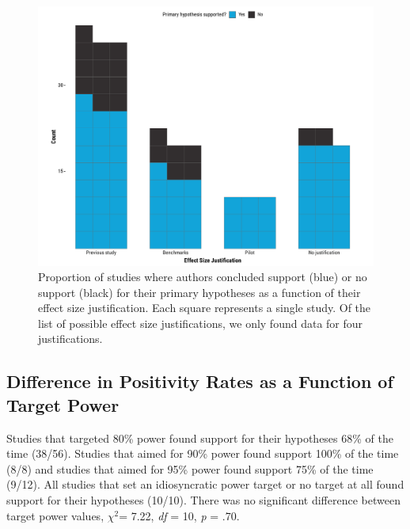 \documentclass[
  man, donotrepeattitle,mask,floatsintext]{apa7}
\begin{document}
\begin{figure}

{\centering \includegraphics{../../figs/fig3} 

}

\caption{Proportion of studies where authors concluded support (blue) or no support (black) for their primary hypotheses as a function of their effect size justification. Each square represents a single study. Of the list of possible effect size justifications, we only found data for four justifications.}\label{fig:fig3}
\end{figure}



\pagebreak

\hypertarget{difference-in-positivity-rates-as-a-function-of-target-power}{%
\subsection{Difference in Positivity Rates as a Function of Target Power}\label{difference-in-positivity-rates-as-a-function-of-target-power}}

Studies that targeted 80\% power found support for their hypotheses 68\% of the time (38/56). Studies that aimed for 90\% power found support 100\% of the time (8/8) and studies that aimed for 95\% power found support 75\% of the time (9/12). All studies that set an idiosyncratic power target or no target at all found support for their hypotheses (10/10). There was no significant difference between target power values, \(\chi^2\)= 7.22, \emph{df} = 10, \emph{p} = .70.
\end{document}
